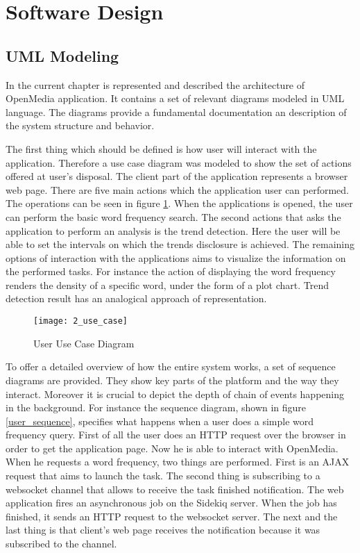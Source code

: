 \section{Software Design}
\subsection{UML Modeling}
In the current chapter is represented and described the architecture of OpenMedia application. It contains a set of relevant diagrams modeled in UML language. The diagrams provide a fundamental documentation an description of the system structure and behavior.

The first thing which should be defined is how user will interact with the application. Therefore a use case diagram was modeled to show the set of actions offered at user's disposal. The client part of the application represents a browser web page. There are five main actions which the application user can performed. The operations can be seen in figure \ref{use_case}. When the applications is opened, the user can perform the basic word frequency search. The second actions that asks the application to perform an analysis is the trend detection. Here the user will be able to set the intervals on which the trends disclosure is achieved. The remaining options of interaction with the applications aims to visualize the information on the performed tasks. For instance the action of displaying the word frequency renders the density of a specific word, under the form of a plot chart. Trend detection result has an analogical approach of representation.

\begin{figure}[!ht]
\centering
\texttt{[image: 2\_use\_case]}
\caption{User Use Case Diagram}\label{use_case}
\end{figure}

To offer a detailed overview of how the entire system works, a set of sequence diagrams are provided. They show key parts of the platform and the way they interact. Moreover it is crucial to depict the depth of chain of events happening in the background.
For instance the sequence diagram, shown in figure \ref{user_sequence}, specifies what happens when a user does a simple word frequency query. First of all the user does an HTTP request over the browser in order to get the application page. Now he is able to interact with OpenMedia. When he requests a word frequency, two things are performed. First is an AJAX request that aims to launch the task. The second thing is subscribing to a websocket channel that allows to receive the task finished notification. The web application fires an asynchronous job on the Sidekiq server. When the job has finished, it sends an HTTP request to the websocket server. The next and the last thing is that client's web page receives the notification because it was subscribed to the channel.

